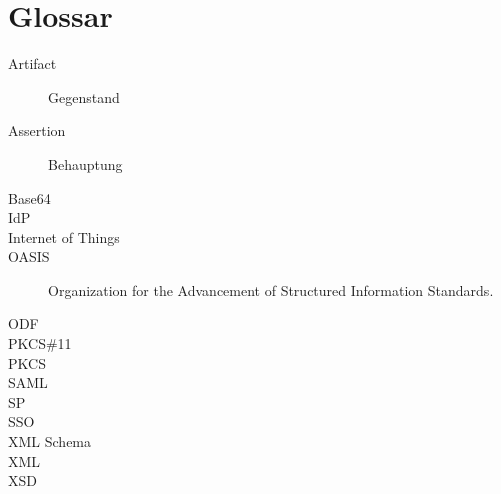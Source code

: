 \chapter{Glossar}

\begin{description}
  \item[Artifact] Gegenstand
  \item[Assertion] Behauptung
  \item[Base64] 
  \item[IdP]
  \item[Internet of Things]
  \item[OASIS] Organization for the Advancement of Structured Information Standards.
  \item[ODF]
  \item[PKCS\#11]
  \item[PKCS]
  \item[SAML]
  \item[SP ]
  \item[SSO]
  \item[XML Schema]
  \item[XML]
  \item[XSD]
\end{description} 
